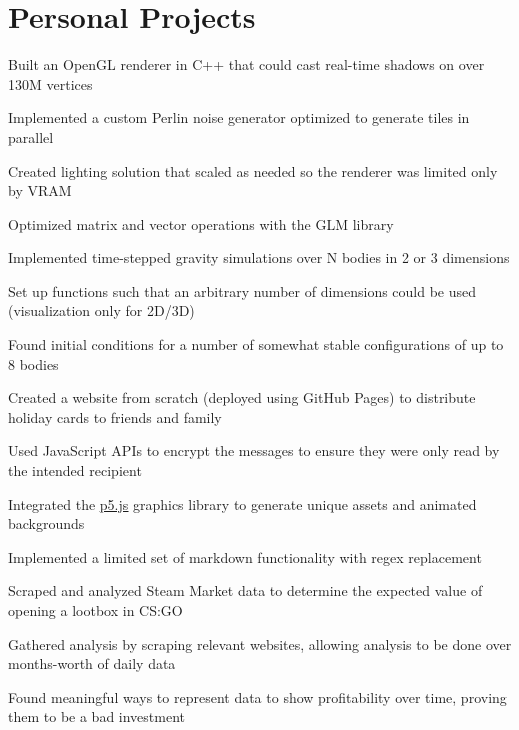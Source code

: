 \section{Personal Projects}

\begin{bullets}
    \item Built an OpenGL renderer in C++ that could cast real-time shadows on over 130M vertices
    \item Implemented a custom Perlin noise generator optimized to generate tiles in parallel
    \item Created lighting solution that scaled as needed so the renderer was limited only by VRAM
    \item Optimized matrix and vector operations with the GLM library
\end{bullets}

\begin{bullets}
    \item Implemented time-stepped gravity simulations over N bodies in 2 or 3 dimensions
    \item Set up functions such that an arbitrary number of dimensions could be used (visualization only for 2D/3D)
    \item Found initial conditions for a number of somewhat stable configurations of up to 8 bodies
\end{bullets}

\begin{bullets}
    \item Created a website from scratch (deployed using GitHub Pages) to distribute holiday cards to friends and family
    \item Used JavaScript APIs to encrypt the messages to ensure they were only read by the intended recipient
    \item Integrated the \href{https://p5js.org}{\underline{p5.js}} graphics library to generate unique assets and animated backgrounds
    \item Implemented a limited set of markdown functionality with regex replacement
\end{bullets}

\begin{bullets}
    \item Scraped and analyzed Steam Market data to determine the expected value of opening a lootbox in CS:GO
    \item Gathered analysis by scraping relevant websites, allowing analysis to be done over months-worth of daily data
    \item Found meaningful ways to represent data to show profitability over time, proving them to be a bad investment
\end{bullets}
